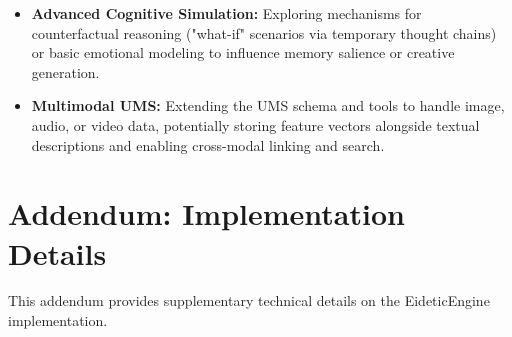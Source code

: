 \documentclass[12pt,a4paper]{article}
\begin{document}
\begin{itemize}
    \item \textbf{Advanced Cognitive Simulation:} Exploring mechanisms for counterfactual reasoning ("what-if" scenarios via temporary thought chains) or basic emotional modeling to influence memory salience or creative generation.

    \item \textbf{Multimodal UMS:} Extending the UMS schema and tools to handle image, audio, or video data, potentially storing feature vectors alongside textual descriptions and enabling cross-modal linking and search. %
\end{itemize}

\section*{Addendum: Implementation Details} %

This addendum provides supplementary technical details on the EideticEngine implementation.
\end{document}
